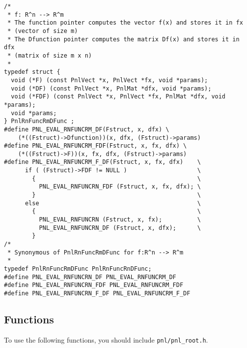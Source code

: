\begin{verbatim}
/*
 * f: R^n --> R^m
 * The function pointer computes the vector f(x) and stores it in fx
 * (vector of size m)
 * The Dfunction pointer computes the matrix Df(x) and stores it in dfx
 * (matrix of size m x n)
 *
typedef struct {
  void (*F) (const PnlVect *x, PnlVect *fx, void *params);
  void (*DF) (const PnlVect *x, PnlMat *dfx, void *params);
  void (*FDF) (const PnlVect *x, PnlVect *fx, PnlMat *dfx, void *params);
  void *params;
} PnlRnFuncRmDFunc ;
#define PNL_EVAL_RNFUNCRM_DF(Fstruct, x, dfx) \
    (*((Fstruct)->Dfunction))(x, dfx, (Fstruct)->params)
#define PNL_EVAL_RNFUNCRM_FDF(Fstruct, x, fx, dfx) \
    (*((Fstruct)->F))(x, fx, dfx, (Fstruct)->params)
#define PNL_EVAL_RNFUNCRM_F_DF(Fstruct, x, fx, dfx)    \
      if ( (Fstruct)->FDF != NULL )                    \
        {                                              \
          PNL_EVAL_RNFUNCRN_FDF (Fstruct, x, fx, dfx); \
        }                                              \
      else                                             \
        {                                              \
          PNL_EVAL_RNFUNCRN (Fstruct, x, fx);          \
          PNL_EVAL_RNFUNCRN_DF (Fstruct, x, dfx);      \
        }
/*
 * Synonymous of PnlRnFuncRmDFunc for f:R^n --> R^m
 *
typedef PnlRnFuncRmDFunc PnlRnFuncRnDFunc;
#define PNL_EVAL_RNFUNCRN_DF PNL_EVAL_RNFUNCRM_DF
#define PNL_EVAL_RNFUNCRN_FDF PNL_EVAL_RNFUNCRM_FDF
#define PNL_EVAL_RNFUNCRN_F_DF PNL_EVAL_RNFUNCRM_F_DF
\end{verbatim}

\subsection{Functions}

To use the following functions, you should include \verb!pnl/pnl_root.h!.


